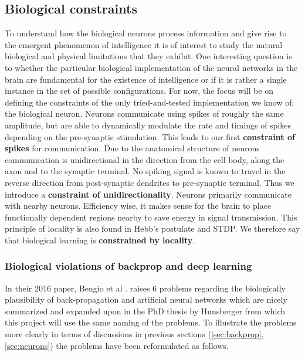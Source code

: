 \documentclass[a4paper,11pt]{article}
\begin{document}
\subsection{Biological constraints} \label{sec:biological-constraints}
To understand how the biological neurons process information and give rise to the emergent phenomenon of intelligence it is of interest to study the natural biological and physical limitations that they exhibit. One interesting question is to whether the particular biological implementation of the neural networks in the brain are fundamental for the existence of intelligence or if it is rather a single instance in the set of possible configurations. For now, the focus will be on defining the constraints of the only tried-and-tested implementation we know of; the biological neuron. Neurons communicate using spikes of roughly the same amplitude, but are able to dynamically modulate the rate and timings of spikes depending on the pre-synaptic stimulation. This leads to our first \textbf{constraint of spikes} for communication. Due to the anatomical structure of neurons communication is unidirectional in the direction from the cell body, along the axon and to the synaptic terminal. No spiking signal is known to travel in the reverse direction from post-synaptic dendrites to pre-synaptic terminal. Thus we introduce a \textbf{constraint of unidirectionality}. Neurons primarily communicate with nearby neurons. Efficiency wise, it makes sense for the brain to place functionally dependent regions nearby to save energy in signal transmission. This principle of locality is also found in Hebb's postulate and STDP. We therefore say that biological learning is \textbf{constrained by locality}.

\newpage
\subsubsection{Biological violations of backprop and deep learning}
In their 2016 paper, Bengio et al \cite{BengioLBL15}. raises 6 problems regarding the biologically plausibility of back-propagation and artificial neural networks which are nicely summarized and expanded upon in the PhD thesis by Hunsberger \cite{Eric2018} from which this project will use the same naming of the problems. To illustrate the problems more clearly in terms of discussions in previous sections (\ref{sec:backprop}, \ref{sec:neurons}) the problems have been reformulated as follows.
\end{document}
